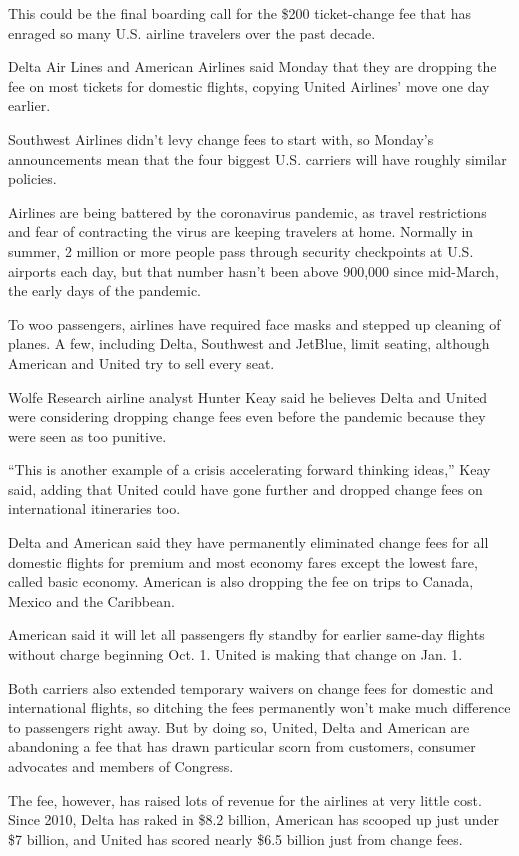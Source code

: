 This could be the final boarding call for the \$200 ticket-change fee
that has enraged so many U.S. airline travelers over the past decade.

Delta Air Lines and American Airlines said Monday that they are dropping
the fee on most tickets for domestic flights, copying United Airlines'
move one day earlier.

Southwest Airlines didn't levy change fees to start with, so Monday's
announcements mean that the four biggest U.S. carriers will have roughly
similar policies.

Airlines are being battered by the coronavirus pandemic, as travel
restrictions and fear of contracting the virus are keeping travelers at
home. Normally in summer, 2 million or more people pass through security
checkpoints at U.S. airports each day, but that number hasn't been above
900,000 since mid-March, the early days of the pandemic.

To woo passengers, airlines have required face masks and stepped up
cleaning of planes. A few, including Delta, Southwest and JetBlue, limit
seating, although American and United try to sell every seat.

Wolfe Research airline analyst Hunter Keay said he believes Delta and
United were considering dropping change fees even before the pandemic
because they were seen as too punitive.

``This is another example of a crisis accelerating forward thinking
ideas,'' Keay said, adding that United could have gone further and
dropped change fees on international itineraries too.

Delta and American said they have permanently eliminated change fees for
all domestic flights for premium and most economy fares except the
lowest fare, called basic economy. American is also dropping the fee on
trips to Canada, Mexico and the Caribbean.

American said it will let all passengers fly standby for earlier
same-day flights without charge beginning Oct. 1. United is making that
change on Jan. 1.

Both carriers also extended temporary waivers on change fees for
domestic and international flights, so ditching the fees permanently
won't make much difference to passengers right away. But by doing so,
United, Delta and American are abandoning a fee that has drawn
particular scorn from customers, consumer advocates and members of
Congress.

The fee, however, has raised lots of revenue for the airlines at very
little cost. Since 2010, Delta has raked in \$8.2 billion, American has
scooped up just under \$7 billion, and United has scored nearly \$6.5
billion just from change fees.

